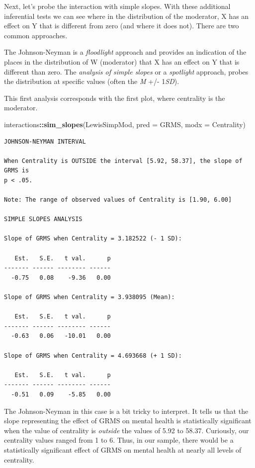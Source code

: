 \documentclass[
  11pt,
]{book}
\newenvironment{Shaded}{\begin{snugshade}}{\end{snugshade}}
\newcommand{\AttributeTok}[1]{\textcolor[rgb]{0.27,0.27,0.27}{#1}}
\newcommand{\FunctionTok}[1]{\textcolor[rgb]{0.27,0.27,0.27}{\textbf{#1}}}
\newcommand{\NormalTok}[1]{#1}
\newcommand{\SpecialCharTok}[1]{\textcolor[rgb]{0.43,0.43,0.43}{\textbf{#1}}}
\begin{document}
Next, let's probe the interaction with simple slopes. With these additional inferential tests we can see where in the distribution of the moderator, X has an effect on Y that is different from zero (and where it does not). There are two common approaches.

The Johnson-Neyman is a \emph{floodlight} approach and provides an indication of the places in the distribution of W (moderator) that X has an effect on Y that is different than zero. The \emph{analysis of simple slopes} or a \emph{spotlight} approach, probes the distribution at specific values (often the \emph{M} +/- 1\emph{SD}).

This first analysis corresponds with the first plot, where centrality is the moderator.

\begin{Shaded}
\begin{Highlighting}[]
\NormalTok{interactions}\SpecialCharTok{::}\FunctionTok{sim\_slopes}\NormalTok{(LewisSimpMod, }\AttributeTok{pred =}\NormalTok{ GRMS, }\AttributeTok{modx =}\NormalTok{ Centrality)}
\end{Highlighting}
\end{Shaded}

\begin{verbatim}
JOHNSON-NEYMAN INTERVAL 

When Centrality is OUTSIDE the interval [5.92, 58.37], the slope of GRMS is
p < .05.

Note: The range of observed values of Centrality is [1.90, 6.00]

SIMPLE SLOPES ANALYSIS 

Slope of GRMS when Centrality = 3.182522 (- 1 SD): 

   Est.   S.E.   t val.      p
------- ------ -------- ------
  -0.75   0.08    -9.36   0.00

Slope of GRMS when Centrality = 3.938095 (Mean): 

   Est.   S.E.   t val.      p
------- ------ -------- ------
  -0.63   0.06   -10.01   0.00

Slope of GRMS when Centrality = 4.693668 (+ 1 SD): 

   Est.   S.E.   t val.      p
------- ------ -------- ------
  -0.51   0.09    -5.85   0.00
\end{verbatim}

The Johnson-Neyman in this case is a bit tricky to interpret. It tells us that the slope representing the effect of GRMS on mental health is statistically significant when the value of centrality is \emph{outside} the values of 5.92 to 58.37. Curiously, our centrality values ranged from 1 to 6. Thus, in our sample, there would be a statistically significant effect of GRMS on mental health at nearly all levels of centrality.
\end{document}
